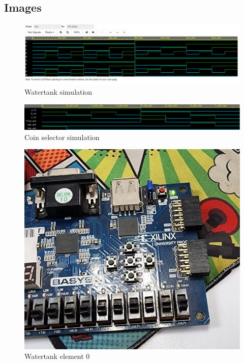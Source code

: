 \documentclass{article}
\begin{document}
\begin{multicols}{2}
	\section{Images}\label{Images}

	\begin{figure}[H]
		\centering
		\includegraphics[width=0.8\linewidth]{images/waves/watertank.png}
		\caption{Watertank simulation}
		\label{Watertank simulation Apendix}
	\end{figure}

	\begin{figure}[H]
		\centering
		\includegraphics[width=0.8\linewidth]{images/waves/coin-selector.png}
		\caption{Coin selector simulation}
		\label{Coin selector simulation Apendix}
	\end{figure}

	\begin{figure}[H]
		\centering
		\includegraphics[width=0.8\linewidth]{images/diagrams/watertank/watertank0.jpg}
		\caption{Watertank element 0}
		\label{Watertank element 0 Apendix}
	\end{figure}


\end{multicols}
\end{document}
